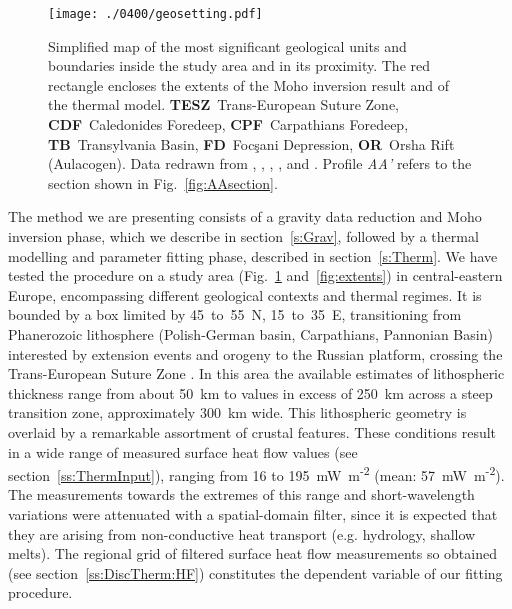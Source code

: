 \begin{figure}
    \begin{adjustbox}{center}
        \texttt{[image: ./0400/geosetting.pdf]}
    \end{adjustbox}
	\caption{Simplified map of the most significant geological units and boundaries inside the study area and in its proximity. The red rectangle encloses the extents of the Moho inversion result and of the thermal model. \textbf{TESZ}~Trans-European Suture Zone, \textbf{CDF}~Caledonides Foredeep, \textbf{CPF}~Carpathians Foredeep, \textbf{TB}~Transylvania Basin, \textbf{FD}~Focşani Depression, \textbf{OR}~Orsha Rift (Aulacogen). Data redrawn from \textcite{Tarapoanca2003}, \textcite{EuCRUST07}, \textcite{Artemieva2013}, \textcite{Mazur2016}, and \textcite{Starostenko2018}. Profile \textit{AA'} refers to the section shown in Fig.~\ref{fig:AAsection}.}
    \label{fig:geosetting}
\end{figure}

The method we are presenting consists of a gravity data reduction and Moho inversion phase, which we describe in section~\ref{s:Grav}, followed by a thermal modelling and parameter fitting phase, described in section~\ref{s:Therm}.
We have tested the procedure on a study area (Fig.~\ref{fig:geosetting} and~\ref{fig:extents}) in central-eastern Europe, encompassing different geological contexts and thermal regimes.
It is bounded by a box limited by 45~to~55\textdegree~N, 15~to~35\textdegree~E, transitioning from Phanerozoic lithosphere (Polish-German basin, Carpathians, Pannonian Basin) interested by extension events and orogeny to the Russian platform, crossing the Trans-European Suture Zone \parencite[TESZ,][]{Jones2010}.
In this area the available estimates of lithospheric thickness range from about 50~km to values in excess of 250~km across a steep transition zone, approximately 300~km wide.
This lithospheric geometry is overlaid by a remarkable assortment of crustal features.
These conditions result in a wide range of measured surface heat flow values (see section~\ref{ss:ThermInput}), ranging from 16 to 195~{mW~m\textsuperscript{-2}} (mean: 57~{mW~m\textsuperscript{-2}}).
The measurements towards the extremes of this range and short-wavelength variations were attenuated with a spatial-domain filter, since it is expected that they are arising from non-conductive heat transport (e.g. hydrology, shallow melts).
The regional grid of filtered surface heat flow measurements so obtained (see section~\ref{ss:DiscTherm:HF}) constitutes the dependent variable of our fitting procedure.

